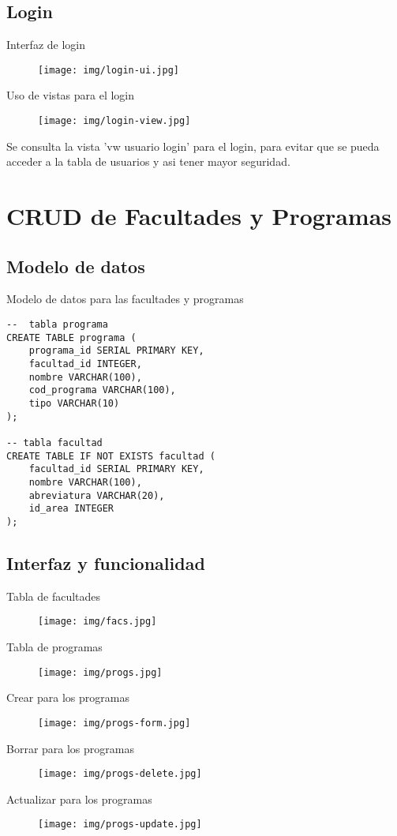 \documentclass[12pt]{article}
\begin{document}
\subsection{Login}
\large{Interfaz de login}
\begin{figure}[H]
    \centering
    \texttt{[image: img/login-ui.jpg]}
\end{figure}
\large{Uso de vistas para el login}
\begin{figure}[H]
    \centering
    \texttt{[image: img/login-view.jpg]}
\end{figure}
Se consulta la vista 'vw usuario login' para el login, para evitar que se pueda acceder a la tabla de usuarios y asi tener mayor seguridad.

\section{CRUD de Facultades y Programas}
\subsection{Modelo de datos}
\large{Modelo de datos para las facultades y programas}
\begin{verbatim}
--  tabla programa
CREATE TABLE programa (
    programa_id SERIAL PRIMARY KEY,
    facultad_id INTEGER,
    nombre VARCHAR(100),
    cod_programa VARCHAR(100),
    tipo VARCHAR(10)
);

-- tabla facultad
CREATE TABLE IF NOT EXISTS facultad (
    facultad_id SERIAL PRIMARY KEY,
    nombre VARCHAR(100),
    abreviatura VARCHAR(20),
    id_area INTEGER
);
\end{verbatim}

\subsection{Interfaz y funcionalidad}

\large{Tabla de facultades}
\begin{figure}[H]
    \centering
    \texttt{[image: img/facs.jpg]}
\end{figure}
\large{Tabla de programas}
\begin{figure}[H]
    \centering
    \texttt{[image: img/progs.jpg]}
    \label{fig:my_label}
\end{figure}

\large{Crear para los programas}
\begin{figure}[H]
    \centering
    \texttt{[image: img/progs-form.jpg]}
    \label{fig:my_label}
\end{figure}
\large{Borrar para los programas}
\begin{figure}[H]
    \centering
    \texttt{[image: img/progs-delete.jpg]}
    \label{fig:my_label}
\end{figure}
\large{Actualizar para los programas}
\begin{figure}[H]
    \centering
    \texttt{[image: img/progs-update.jpg]}
    \label{fig:my_label}
\end{figure}
\end{document}
